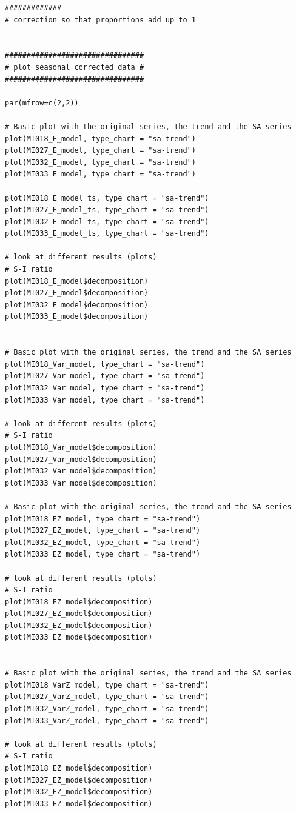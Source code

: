 \documentclass[12pt,a4paper,oneside]{book}
\begin{document}
\begin{lstlisting}
#############
# correction so that proportions add up to 1


################################
# plot seasonal corrected data #
################################

par(mfrow=c(2,2))

# Basic plot with the original series, the trend and the SA series
plot(MI018_E_model, type_chart = "sa-trend")
plot(MI027_E_model, type_chart = "sa-trend")
plot(MI032_E_model, type_chart = "sa-trend")
plot(MI033_E_model, type_chart = "sa-trend")

plot(MI018_E_model_ts, type_chart = "sa-trend")
plot(MI027_E_model_ts, type_chart = "sa-trend")
plot(MI032_E_model_ts, type_chart = "sa-trend")
plot(MI033_E_model_ts, type_chart = "sa-trend")

# look at different results (plots)
# S-I ratio
plot(MI018_E_model$decomposition)
plot(MI027_E_model$decomposition)
plot(MI032_E_model$decomposition)
plot(MI033_E_model$decomposition)


# Basic plot with the original series, the trend and the SA series
plot(MI018_Var_model, type_chart = "sa-trend")
plot(MI027_Var_model, type_chart = "sa-trend")
plot(MI032_Var_model, type_chart = "sa-trend")
plot(MI033_Var_model, type_chart = "sa-trend")

# look at different results (plots)
# S-I ratio
plot(MI018_Var_model$decomposition)
plot(MI027_Var_model$decomposition)
plot(MI032_Var_model$decomposition)
plot(MI033_Var_model$decomposition)

# Basic plot with the original series, the trend and the SA series
plot(MI018_EZ_model, type_chart = "sa-trend")
plot(MI027_EZ_model, type_chart = "sa-trend")
plot(MI032_EZ_model, type_chart = "sa-trend")
plot(MI033_EZ_model, type_chart = "sa-trend")

# look at different results (plots)
# S-I ratio
plot(MI018_EZ_model$decomposition)
plot(MI027_EZ_model$decomposition)
plot(MI032_EZ_model$decomposition)
plot(MI033_EZ_model$decomposition)


# Basic plot with the original series, the trend and the SA series
plot(MI018_VarZ_model, type_chart = "sa-trend")
plot(MI027_VarZ_model, type_chart = "sa-trend")
plot(MI032_VarZ_model, type_chart = "sa-trend")
plot(MI033_VarZ_model, type_chart = "sa-trend")

# look at different results (plots)
# S-I ratio
plot(MI018_EZ_model$decomposition)
plot(MI027_EZ_model$decomposition)
plot(MI032_EZ_model$decomposition)
plot(MI033_EZ_model$decomposition)



\end{lstlisting}
\end{document}
